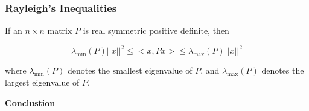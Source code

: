 \begin{frame}
	\frametitle{Rayleigh's Inequalities}

	If an $n \times n$ matrix $P$ is real symmetric positive definite, then

	$$\lambda_{\min}(P)||x||^2 \leq <x,Px> \leq \lambda_{\max}(P)||x||^2$$

	where $\lambda_{\min}(P)$ denotes the smallest eigenvalue of $P$, and $\lambda_{\max}(P)$ denotes the largest eigenvalue of $P$.

\end{frame}

\begin{frame}
	\begin{center}
	\textbf{Conclustion}
	\end{center}
\end{frame}
